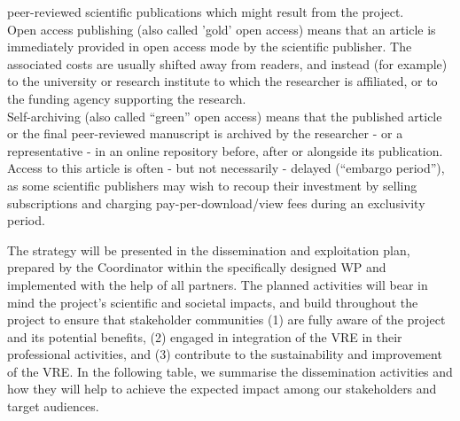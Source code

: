 {peer-reviewed scientific publications which might result from the project.\\
Open access publishing (also called 'gold' open access) means that an article is
immediately provided in open access mode by the scientific publisher. The associated costs
are usually shifted away from readers, and instead (for example) to the university or
research institute to which the researcher is affiliated, or to the funding agency supporting
the research.\\
Self-archiving (also called ``green'' open access) means that the published article or the
final peer-reviewed manuscript is archived by the researcher - or a representative - in an
online repository before, after or alongside its publication. Access to this article is often -
but not necessarily - delayed (``embargo period''), as some scientific publishers may wish to
recoup their investment by selling subscriptions and charging pay-per-download/view fees
during an exclusivity period.}


The strategy will be presented in the dissemination and exploitation plan, prepared by the Coordinator within the specifically designed WP and implemented with the help of all partners. The planned activities will bear in mind the project's scientific and societal impacts, and build throughout the project to ensure that stakeholder communities (1) are fully aware of the project and its potential benefits, (2) engaged in integration of the VRE in their professional activities, and (3) contribute to the sustainability and improvement of the VRE. In the following table, we summarise the dissemination activities and how they will help to achieve the expected impact among our stakeholders and target audiences. 


